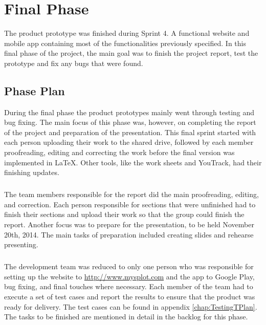 \chapter{Final Phase}
\label{chap:FinalPhase}

The product prototype was finished during Sprint 4. A functional website and mobile app containing most of the functionalities previously specified. In this final phase of the project, the main goal was to finish the project report, test the prototype and fix any bugs that were found.

\section{Phase Plan}
\label{sec:FinalPlan}

During the final phase the product prototypes mainly went through testing and bug fixing. The main focus of this phase was, however, on completing the report of the project and preparation of the presentation. This final sprint started with each person uploading their work to the shared drive, followed by each member proofreading, editing and correcting the work before the final version was implemented in LaTeX. Other tools, like the work sheets and YouTrack, had their finishing updates.

\paragraph{} The team members responsible for the report did the main proofreading, editing, and correction. Each person responsible for sections that were unfinished had to finish their sections and upload their work so that the group could finish the report. Another focus was to prepare for the presentation, to be held November 20th, 2014. The main tasks of preparation included creating slides and rehearse presenting.

\paragraph{} The development team was reduced to only one person who was responsible for setting up the website to \href{www.mysplot.com}{http://www.mysplot.com} and the app to Google Play, bug fixing, and final touches where necessary. Each member of the team had to execute a set of test cases and report the results to ensure that the product was ready for delivery. The test cases can be found in appendix \ref{chap:TestingTPlan}.
The tasks to be finished are mentioned in detail in the backlog for this phase.

